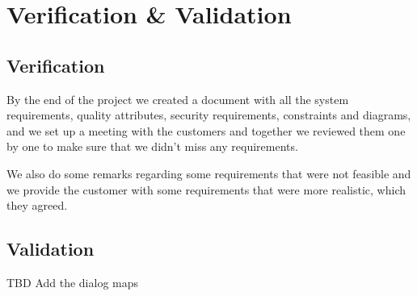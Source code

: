 \section{Verification \& Validation}
\subsection{Verification}
\noindent By the end of the project we created a document with all the system 
requirements, quality attributes, security requirements, constraints and 
diagrams, and we set up a meeting with the customers and together we reviewed 
them one by one to make sure that we didn’t miss any requirements.

\noindent We also do some remarks regarding some requirements that were not 
feasible and we provide the customer with some requirements that were more 
realistic, which they agreed.

\subsection{Validation}

TBD Add the dialog maps